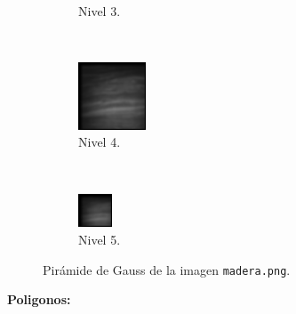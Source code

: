 \documentclass[12pt, letterpaper]{article}
\begin{document}
\begin{figure}[H]
\begin{subfigure}[t]{0.32\textwidth}
      \caption{Nivel 3.}
  \end{subfigure}
  ~ 
  \begin{subfigure}[t]{0.32\textwidth}
      \centering
      \includegraphics[width = 0.22\textwidth]{madera/gp4.png}
      \caption{Nivel 4.}
  \end{subfigure}
  ~ 
  \begin{subfigure}[t]{0.32\textwidth}
      \centering
      \includegraphics[width = 0.11\textwidth]{madera/gp5.png}
      \caption{Nivel 5.}
  \end{subfigure}
  \caption{Pirámide de Gauss de la imagen \texttt{madera.png}.}
  \label{gpmadera}
\end{figure}

\par \textbf{Poligonos:}
\end{document}

